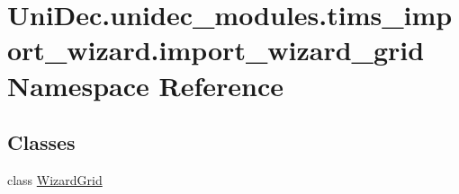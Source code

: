 \hypertarget{namespace_uni_dec_1_1unidec__modules_1_1tims__import__wizard_1_1import__wizard__grid}{}\section{Uni\+Dec.\+unidec\+\_\+modules.\+tims\+\_\+import\+\_\+wizard.\+import\+\_\+wizard\+\_\+grid Namespace Reference}
\label{namespace_uni_dec_1_1unidec__modules_1_1tims__import__wizard_1_1import__wizard__grid}
\subsection*{Classes}
\begin{DoxyCompactItemize}
\item 
class \hyperlink{class_uni_dec_1_1unidec__modules_1_1tims__import__wizard_1_1import__wizard__grid_1_1_wizard_grid}{Wizard\+Grid}
\end{DoxyCompactItemize}
